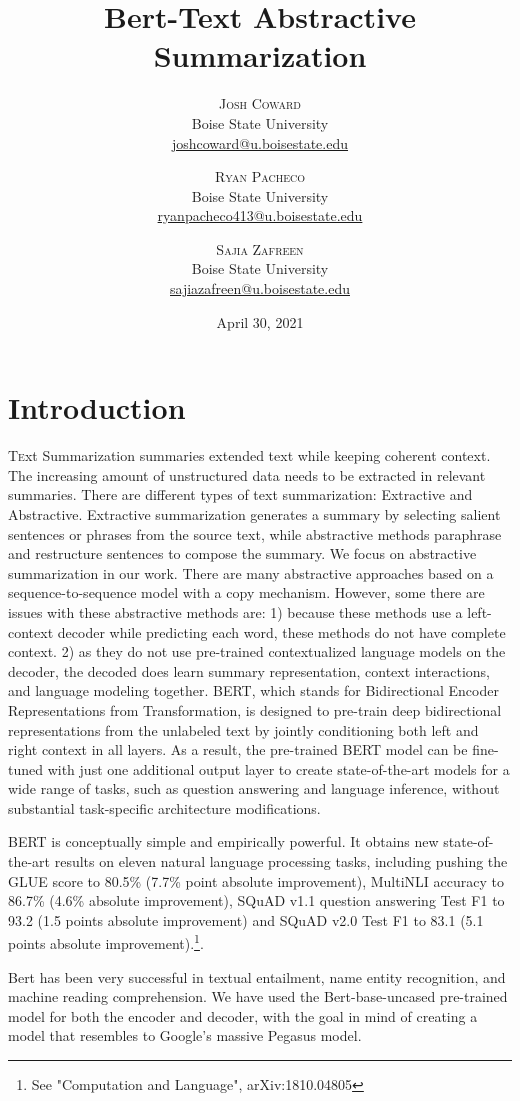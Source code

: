 \documentclass[twoside,twocolumn]{article}
\title{Bert-Text Abstractive Summarization} %
\author{%
\textsc{Josh Coward}\\[1ex] %
\normalsize Boise State University \\ %
\normalsize \href{mailto:joshcoward@u.boisestate.edu}{joshcoward@u.boisestate.edu} %
\and %
\textsc{Ryan Pacheco}\\[1ex] %
\normalsize Boise State University \\ %
\normalsize \href{mailto:ryanpacheco413@u.boisestate.edu}{ryanpacheco413@u.boisestate.edu} %
\and %
\textsc{Sajia Zafreen}\\[1ex] %
\normalsize Boise State University \\ %
\normalsize \href{mailto:sajiazafreen@u.boisestate.edu}{sajiazafreen@u.boisestate.edu} %
}
\date{April 30, 2021} %
\begin{document}
\maketitle



\section{Introduction}
\lettrine[nindent=0em,lines=3]

Text Summarization summaries extended text while keeping coherent context. The increasing amount of unstructured data needs to be 
extracted in relevant summaries. There are different types of text summarization: Extractive and Abstractive. Extractive summarization 
generates a summary by selecting salient sentences or phrases from the source text, while abstractive methods paraphrase and restructure 
sentences to compose the summary. We focus on abstractive summarization in our work. There are many abstractive approaches based on a 
sequence-to-sequence model with a copy mechanism. However, some there are issues with these abstractive methods are: 1) because these 
methods use a left-context decoder while predicting each word, these methods do not have complete context. 2) as they do not use 
pre-trained contextualized language models on the decoder, the decoded does learn summary representation, context interactions, 
and language modeling together. 
BERT, which stands for Bidirectional Encoder Representations from Transformation, is designed to pre-train deep bidirectional representations 
from the unlabeled text by jointly conditioning both left and right context in all layers. As a result, the pre-trained BERT model can be 
fine-tuned with just one additional output layer to create state-of-the-art models for a wide range of tasks, such as question answering 
and language inference, without substantial task-specific architecture modifications.\par
BERT is conceptually simple and empirically powerful. It obtains new state-of-the-art results on eleven natural language processing tasks, 
including pushing the GLUE score to 80.5\% (7.7\% point absolute improvement), MultiNLI accuracy to 86.7\% (4.6\% absolute improvement), 
SQuAD v1.1 question answering Test F1 to 93.2 (1.5 points absolute improvement) and SQuAD v2.0 Test F1 to 83.1 (5.1 points absolute 
improvement).\footnote{See "Computation and Language", arXiv:1810.04805 }. \par
Bert has been very successful in textual entailment, name entity recognition, and machine reading comprehension. We have used the 
Bert-base-uncased pre-trained model for both the encoder and decoder, with the goal in mind of creating a model that resembles to Google's 
massive Pegasus model.
\end{document}
